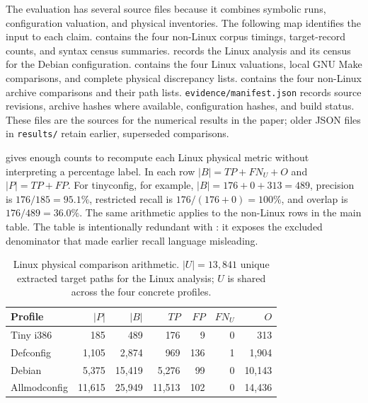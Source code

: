 \documentclass[acmsmall,screen,review]{acmart}
\begin{document}
The evaluation has several source files because it combines symbolic runs, configuration valuation, and physical inventories. The following map identifies the input to each claim.  contains the four non-Linux corpus timings, target-record counts, and syntax census summaries.  records the Linux analysis and its census for the Debian configuration.  contains the four Linux valuations, local GNU Make comparisons, and complete physical discrepancy lists.  contains the four non-Linux archive comparisons and their path lists. \texttt{evidence/manifest.json} records source revisions, archive hashes where available, configuration hashes, and build status. These files are the sources for the numerical results in the paper; older JSON files in \texttt{results/} retain earlier, superseded comparisons.

 gives enough counts to recompute each Linux physical metric without interpreting a percentage label. In each row $|B|=TP+FN_U+O$ and $|P|=TP+FP$. For tinyconfig, for example, $|B|=176+0+313=489$, precision is $176/185=95.1\%$, restricted recall is $176/(176+0)=100\%$, and overlap is $176/489=36.0\%$. The same arithmetic applies to the non-Linux rows in the main table. The table is intentionally redundant with : it exposes the excluded denominator that made earlier recall language misleading.

\begin{table}[t]
\centering\footnotesize
\caption{Linux physical comparison arithmetic. $|U|=13{,}841$ unique extracted target paths for the Linux analysis; $U$ is shared across the four concrete profiles.}
\label{tab:arithmetic}
\begin{tabular}{lrrrrrr}
\toprule
Profile & $|P|$ & $|B|$ & $TP$ & $FP$ & $FN_U$ & $O$ \\
\midrule
Tiny i386 & 185 & 489 & 176 & 9 & 0 & 313 \\
Defconfig & 1,105 & 2,874 & 969 & 136 & 1 & 1,904 \\
Debian & 5,375 & 15,419 & 5,276 & 99 & 0 & 10,143 \\
Allmodconfig & 11,615 & 25,949 & 11,513 & 102 & 0 & 14,436 \\
\bottomrule
\end{tabular}
\end{table}
\end{document}
